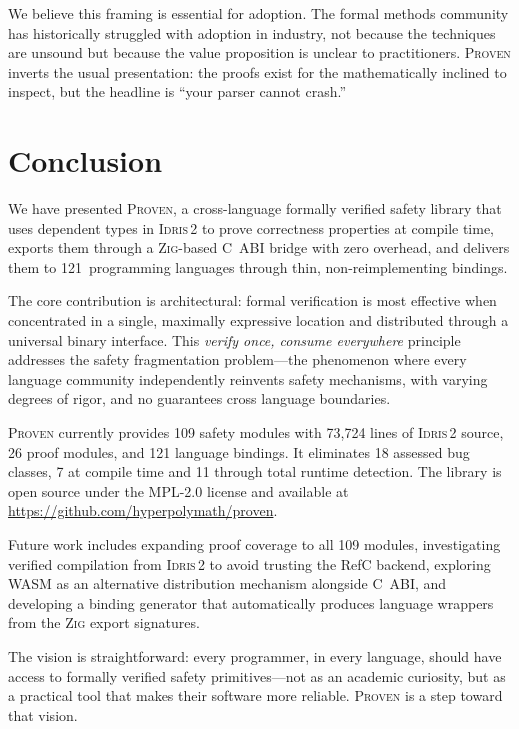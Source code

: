 \documentclass[11pt,a4paper]{article}
\newcommand{\proven}{\textsc{Proven}}
\newcommand{\idris}{\textsc{Idris\,2}}
\newcommand{\zig}{\textsc{Zig}}
\begin{document}
We believe this framing is essential for adoption. The formal methods
community has historically struggled with adoption in industry, not
because the techniques are unsound but because the value proposition is
unclear to practitioners. \proven{} inverts the usual presentation:
the proofs exist for the mathematically inclined to inspect, but the
headline is ``your parser cannot crash.''


\section{Conclusion}
\label{sec:conclusion}

We have presented \proven{}, a cross-language formally verified safety
library that uses dependent types in \idris{} to prove correctness
properties at compile time, exports them through a \zig{}-based C~ABI
bridge with zero overhead, and delivers them to 121~programming languages
through thin, non-reimplementing bindings.

The core contribution is architectural: formal verification is most
effective when concentrated in a single, maximally expressive location
and distributed through a universal binary interface. This
\emph{verify once, consume everywhere} principle addresses the safety
fragmentation problem---the phenomenon where every language community
independently reinvents safety mechanisms, with varying degrees of rigor,
and no guarantees cross language boundaries.

\proven{} currently provides 109 safety modules with 73,724 lines of
\idris{} source, 26 proof modules, and 121 language bindings. It
eliminates 18 assessed bug classes, 7 at compile time and 11 through
total runtime detection. The library is open source under the
MPL-2.0 license and available at
\url{https://github.com/hyperpolymath/proven}.

Future work includes expanding proof coverage to all 109 modules,
investigating verified compilation from \idris{} to avoid trusting the
RefC backend, exploring WASM as an alternative distribution mechanism
alongside C~ABI, and developing a binding generator that automatically
produces language wrappers from the \zig{} export signatures.

The vision is straightforward: every programmer, in every language,
should have access to formally verified safety primitives---not as an
academic curiosity, but as a practical tool that makes their software
more reliable. \proven{} is a step toward that vision.
\end{document}
